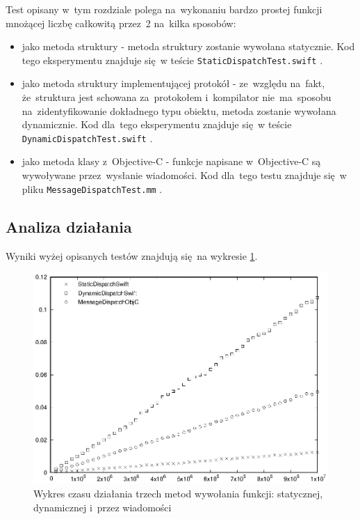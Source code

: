 \documentclass[mgr, shortabstract]{iithesis}
\newcommand{\swiftinline}[1]{
    \texttt{#1}
}
\begin{document}
Test opisany w~tym rozdziale polega na~wykonaniu bardzo prostej funkcji mnożącej liczbę całkowitą przez~2 na~kilka sposobów:

\begin{itemize}
    \item jako metoda struktury - metoda struktury zostanie wywołana statycznie. Kod tego eksperymentu znajduje się w teście \swiftinline{StaticDispatchTest.swift}.
    \item jako metoda struktury implementującej protokół - ze~względu na~fakt, że~struktura jest schowana za~protokołem i~kompilator nie~ma~sposobu na~zidentyfikowanie dokładnego typu obiektu, metoda zostanie wywołana dynamicznie. Kod dla~tego eksperymentu znajduje się w teście \swiftinline{DynamicDispatchTest.swift}.
    \item jako metoda klasy z~Objective-C - funkcje napisane w~Objective-C są wywoływane przez~wysłanie wiadomości. Kod dla~tego testu znajduje się w pliku \swiftinline{MessageDispatchTest.mm}.
\end{itemize}

\subsection{Analiza działania}

Wyniki wyżej opisanych testów znajdują się na wykresie \ref{p:dispatch_method}.

\begin{figure}[ht]
    \includegraphics{plots/Dispatch.eps}
    \caption{Wykres czasu działania trzech metod wywołania funkcji: statycznej, dynamicznej i~przez wiadomości}
    \label{p:dispatch_method}
\end{figure}
\end{document}
